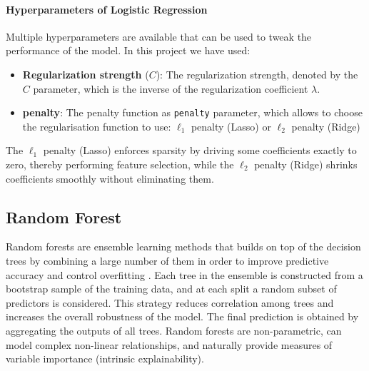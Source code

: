 \paragraph{Hyperparameters of Logistic Regression}
Multiple hyperparameters are available that can be used to tweak the performance of the model. In this project we have used:
\begin{itemize}
    \item \textbf{Regularization strength} ($C$): The regularization strength, denoted by the $C$ parameter, which is the inverse of the regularization coefficient $\lambda$.
    \item \textbf{penalty}: The penalty function as \texttt{penalty} parameter, which allows to choose the regularisation function to use: $\ell_{1}$ penalty (Lasso) or $\ell_{2}$ penalty (Ridge)
\end{itemize}

The $\ell_{1}$ penalty (Lasso) enforces sparsity by driving some coefficients exactly to zero, thereby performing feature selection, while the $\ell_{2}$ penalty (Ridge) shrinks coefficients smoothly without eliminating them.

\subsection{Random Forest}\label{subsec:method-rand-forest}
Random forests are ensemble learning methods that builds on top of the decision trees by combining a large number of them in order to improve predictive accuracy and control overfitting \citep{Breiman2001}. Each tree in the ensemble is constructed from a bootstrap sample of the training data, and at each split a random subset of predictors is considered. This strategy reduces correlation among trees and increases the overall robustness of the model. The final prediction is obtained by aggregating the outputs of all trees. Random forests are non-parametric, can model complex non-linear relationships, and naturally provide measures of variable importance (intrinsic explainability).


